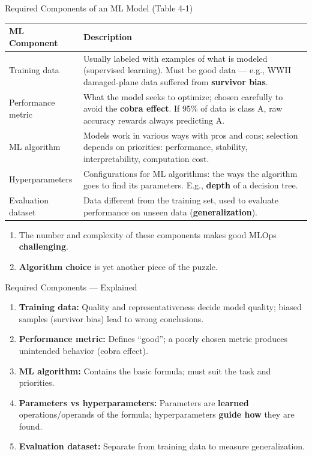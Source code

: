\begin{frame}{Required Components of an ML Model (Table 4-1)}
\begin{table}
\centering
\renewcommand{\arraystretch}{1.2}
\scriptsize
\begin{tabular}{|p{2.6cm}|p{11cm}|}
\hline
\textbf{ML Component} & \textbf{Description} \\ \hline
Training data & Usually labeled with examples of what is modeled (supervised learning). Must be good data --- e.g., WWII damaged-plane data suffered from \textbf{survivor bias}. \\ \hline
Performance metric & What the model seeks to optimize; chosen carefully to avoid the \textbf{cobra effect}. If 95\% of data is class A, raw accuracy rewards always predicting A. \\ \hline
ML algorithm & Models work in various ways with pros and cons; selection depends on priorities: performance, stability, interpretability, computation cost. \\ \hline
Hyperparameters & Configurations for ML algorithms: the ways the algorithm goes to find its parameters. E.g., \textbf{depth} of a decision tree. \\ \hline
Evaluation dataset & Data different from the training set, used to evaluate performance on unseen data (\textbf{generalization}). \\ \hline
\end{tabular}
\end{table}
\begin{enumerate}\small
\item<1-> The number and complexity of these components makes good MLOps \textbf{challenging}.
\item<2-> \textbf{Algorithm choice} is yet another piece of the puzzle.
\end{enumerate}
\end{frame}

\begin{frame}{Required Components --- Explained}
\begin{enumerate}
\item<1-> \textbf{Training data:} Quality and representativeness decide model quality; biased samples (survivor bias) lead to wrong conclusions.
\item<2-> \textbf{Performance metric:} Defines ``good''; a poorly chosen metric produces unintended behavior (cobra effect).
\item<3-> \textbf{ML algorithm:} Contains the basic formula; must suit the task and priorities.
\item<4-> \textbf{Parameters vs hyperparameters:} Parameters are \textbf{learned} operations/operands of the formula; hyperparameters \textbf{guide how} they are found.
\item<5-> \textbf{Evaluation dataset:} Separate from training data to measure generalization.
\end{enumerate}
\end{frame}

